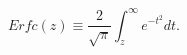 \begin{equation}
\label{error}
Erfc(z) \equiv \frac{2}{\sqrt{\pi}} 
\int_z^{\infty} e^{-t^2} dt.
\end{equation}

